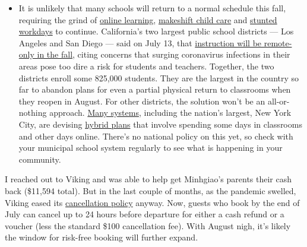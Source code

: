 \begin{itemize}
  \begin{itemize}
  \tightlist
  \item
    It is unlikely that many schools will return to a normal schedule
    this fall, requiring the grind of
    \href{https://www.nytimes.com/2020/06/05/us/coronavirus-education-lost-learning.html?action=click\&pgtype=Article\&state=default\&region=MAIN_CONTENT_3\&context=storylines_faq}{online
    learning},
    \href{https://www.nytimes.com/2020/05/29/us/coronavirus-child-care-centers.html?action=click\&pgtype=Article\&state=default\&region=MAIN_CONTENT_3\&context=storylines_faq}{makeshift
    child care} and
    \href{https://www.nytimes.com/2020/06/03/business/economy/coronavirus-working-women.html?action=click\&pgtype=Article\&state=default\&region=MAIN_CONTENT_3\&context=storylines_faq}{stunted
    workdays} to continue. California's two largest public school
    districts --- Los Angeles and San Diego --- said on July 13, that
    \href{https://www.nytimes.com/2020/07/13/us/lausd-san-diego-school-reopening.html?action=click\&pgtype=Article\&state=default\&region=MAIN_CONTENT_3\&context=storylines_faq}{instruction
    will be remote-only in the fall}, citing concerns that surging
    coronavirus infections in their areas pose too dire a risk for
    students and teachers. Together, the two districts enroll some
    825,000 students. They are the largest in the country so far to
    abandon plans for even a partial physical return to classrooms when
    they reopen in August. For other districts, the solution won't be an
    all-or-nothing approach.
    \href{https://bioethics.jhu.edu/research-and-outreach/projects/eschool-initiative/school-policy-tracker/}{Many
    systems}, including the nation's largest, New York City, are
    devising
    \href{https://www.nytimes.com/2020/06/26/us/coronavirus-schools-reopen-fall.html?action=click\&pgtype=Article\&state=default\&region=MAIN_CONTENT_3\&context=storylines_faq}{hybrid
    plans} that involve spending some days in classrooms and other days
    online. There's no national policy on this yet, so check with your
    municipal school system regularly to see what is happening in your
    community.
  \end{itemize}
\end{itemize}

I reached out to Viking and was able to help get Minhgiao's parents
their cash back (\$11,594 total). But in the last couple of months, as
the pandemic swelled, Viking eased its
\href{https://www.vikingcruises.com/oceans/risk-free-guarantee.html}{cancellation
policy} anyway. Now, guests who book by the end of July can cancel up to
24 hours before departure for either a cash refund or a voucher (less
the standard \$100 cancellation fee). With August nigh, it's likely the
window for risk-free booking will further expand.


